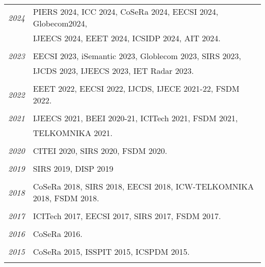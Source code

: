 \documentclass[paper=a4,fontsize=11pt]{scrartcl}
\begin{document}
\begin{longtable}{r|p{12cm}}
	\emph{2024} & PIERS 2024, ICC 2024, CoSeRa 2024, EECSI 2024, Globecom2024, \\
		& IJEECS 2024, EEET 2024, ICSIDP 2024, AIT 2024. \\
	\multicolumn{2}{c}{} \\
	
	\emph{2023} & EECSI 2023, iSemantic 2023, Globlecom 2023, SIRS 2023, \\
		& IJCDS 2023, IJEECS 2023, IET Radar 2023. \\
	\multicolumn{2}{c}{} \\
	
	\emph{2022} & EEET 2022, EECSI 2022, IJCDS, IJECE 2021-22, FSDM 2022. \\
	\multicolumn{2}{c}{} \\
	
	\emph{2021} & IJEECS 2021, BEEI 2020-21, ICITech 2021, FSDM 2021, \\
		& TELKOMNIKA 2021. \\
	\multicolumn{2}{c}{} \\
	
	\emph{2020} & CITEI 2020, SIRS 2020, FSDM 2020. \\
	\multicolumn{2}{c}{} \\
	
	\emph{2019} & SIRS 2019, DISP 2019 \\
	\multicolumn{2}{c}{} \\
	
	\emph{2018} & CoSeRa 2018, SIRS 2018, EECSI 2018, ICW-TELKOMNIKA 2018, FSDM 2018.\\
	\multicolumn{2}{c}{} \\
	
	\emph{2017} & ICITech 2017, EECSI 2017, SIRS 2017, FSDM 2017.\\
	\multicolumn{2}{c}{} \\
	
	\emph{2016} & CoSeRa 2016.\\
	\multicolumn{2}{c}{} \\
	
	\emph{2015} & CoSeRa 2015, ISSPIT 2015, ICSPDM 2015.\\
	\multicolumn{2}{c}{} 
\end{longtable}
\end{document}
